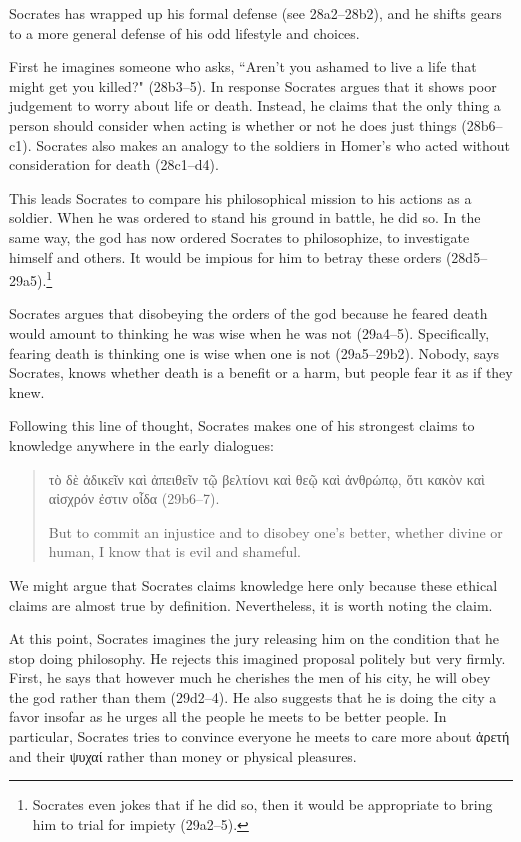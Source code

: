 \documentclass[11pt]{article}
\begin{document}
Socrates has wrapped up his formal defense (see 28a2--28b2), and he shifts
gears to a more general defense of his odd lifestyle and choices.

First he imagines someone who asks, ``Aren't you ashamed to live a life that
might get you killed?" (28b3--5).  In response Socrates argues that it shows
poor judgement to worry about life or death. Instead, he claims that the only
thing a person should consider when acting is whether or not he does just
things (28b6--c1).  Socrates also makes an analogy to the soldiers in Homer's
 who acted without consideration for death (28c1--d4).

This leads Socrates to compare his philosophical mission to his actions as
a soldier.  When he was ordered to stand his ground in battle, he did so.  In
the same way, the god has now ordered Socrates to philosophize, to investigate
himself and others.  It would be impious for him to betray these orders
(28d5--29a5).\footnote{Socrates even jokes that if he did so, then it would be
appropriate to bring him to trial for impiety (29a2--5).}

Socrates argues that disobeying the orders of the god because he feared death
would amount to thinking he was wise when he was not (29a4--5).  Specifically,
fearing death is thinking one is wise when one is not (29a5--29b2).  Nobody,
says Socrates, knows whether death is a benefit or a harm, but people fear it
as if they knew.

Following this line of thought, Socrates makes one of his strongest claims to
knowledge anywhere in the early dialogues:

\begin{quote}
    {\g τὸ δὲ ἀδικεῖν καὶ ἀπειθεῖν τῷ βελτίονι καὶ θεῷ καὶ ἀνθρώπῳ, ὅτι κακὸν
    καὶ αἰσχρόν ἐστιν οἶδα} (29b6--7).

    But to commit an injustice and to disobey one's better, whether divine or
    human, I know that is evil and shameful.
\end{quote}

We might argue that Socrates claims knowledge here only because these ethical
claims are almost true by definition.  Nevertheless, it is worth noting the
claim.

At this point, Socrates imagines the jury releasing him on the condition that
he stop doing philosophy.  He rejects this imagined proposal politely but very
firmly.  First, he says that however much he cherishes the men of his city, he
will obey the god rather than them (29d2--4).  He also suggests that he is
doing the city a favor insofar as he urges all the people he meets to be better
people.  In particular, Socrates tries to convince everyone he meets to care
more about {\g ἀρετή} and their {\g ψυχαί} rather than money or physical
pleasures.
\end{document}
